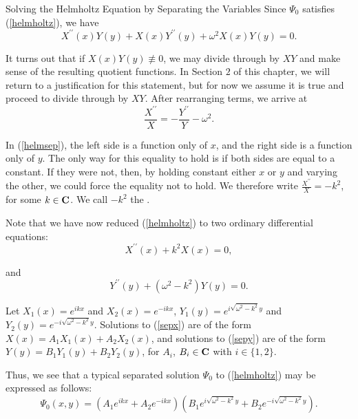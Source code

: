\begin{section}{Solving the Helmholtz Equation by Separating the Variables}
Since $\Psi_0$ satisfies (\ref{helmholtz}), we have
\begin{equation}
\label{helmsepeq}
X^{\prime\prime}(x)Y(y) + X(x)Y^{\prime\prime}(y) + \omega^2X(x)Y(y) = 0.
\end{equation}

It turns out that if $X(x)Y(y) \not\equiv 0$, we may divide through by $XY$ and make sense of the resulting quotient functions.  In Section $2$ of this chapter, we will return to a justification for this statement, but for now we assume it is true and proceed to divide through by $XY$.  After rearranging terms, we arrive at
\begin{equation}
\label{helmsep}
\frac{X^{\prime\prime}}{X} = -\frac{Y^{\prime\prime}}{Y} - \omega^2.
\end{equation}

In (\ref{helmsep}), the left side is a function only of $x$, and the right side is a function only of $y$.  The only way for this equality to hold is if both sides are equal to a constant.  If they were not, then, by holding constant either $x$ or $y$ and varying the other, we could force the equality not to hold.  We therefore write $\frac{X^{\prime\prime}}{X} = -k^2$, for some $k \in \mathbf{C}$.  We call $-k^2$ the .

Note that we have now reduced (\ref{helmholtz}) to two ordinary differential equations:
\begin{equation}
\label{sepx}
X^{\prime\prime}(x) + k^2X(x) = 0,
\end{equation}

and
\begin{equation}
\label{sepy}
Y^{\prime\prime}(y) + (\omega^2 - k^2)Y(y) = 0.
\end{equation}

Let $X_1(x) = e^{ikx}$ and $X_2(x) = e^{-ikx}$, $Y_1(y) = e^{i\sqrt{\omega^2 - k^2}y}$ and $Y_2(y) = e^{-i\sqrt{\omega^2 - k^2}y}$.  Solutions to (\ref{sepx}) are of the form $X(x) = A_1X_1(x) + A_2X_2(x)$, and solutions to (\ref{sepy}) are of the form $Y(y) = B_1Y_1(y) + B_2Y_2(y)$, for $A_i$, $B_i \in \mathbf{C}$ with $i \in \{1,2\}$.

Thus, we see that a typical separated solution $\Psi_0$ to (\ref{helmholtz}) may be expressed as follows:
\begin{equation}
\label{helmsol}
\Psi_0(x,y) = (A_1e^{ikx} + A_2e^{-ikx})(B_1e^{i\sqrt{\omega^2 - k^2}y} + B_2e^{-i\sqrt{\omega^2 - k^2}y}).
\end{equation}


\end{section}
